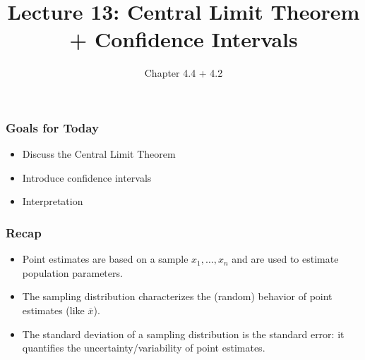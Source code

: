 \documentclass[handout]{beamer}
\title{Lecture 13: Central Limit Theorem + Confidence Intervals}
\author{Chapter 4.4 + 4.2}
\date{}
\newcommand{\blue}[1]{\textcolor{blue2}{#1}}
\newcommand{\xbar}{\overline{x}}
\begin{document}
\begin{frame}
\titlepage
\end{frame}


\begin{frame}[fragile]
\frametitle{Goals for Today}

\begin{itemize}
\item Discuss the Central Limit Theorem
\item Introduce confidence intervals
\item Interpretation
\end{itemize}

\end{frame}


\begin{frame}[fragile]
\frametitle{Recap}

\begin{itemize}
\item \blue{Point estimates} are based on a sample $x_1, \ldots, x_n$ and are used to estimate population parameters.
\pause \item The \blue{sampling distribution} characterizes the (random) behavior of point estimates (like $\xbar$).
\pause \item The standard deviation of a sampling distribution is the \blue{standard error}: it quantifies the uncertainty/variability of point estimates.  
\end{itemize}

\end{frame}
\end{document}

